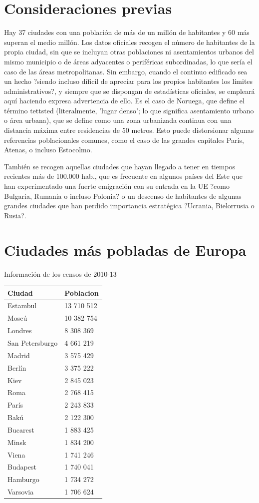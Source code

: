 \documentclass[10pt,letterpaper,oneside]{book}
\begin{document}
\section{Consideraciones previas}
Hay 37 ciudades con una población de más de un millón de habitantes y 60 más superan el medio millón. Los datos oficiales recogen el número de habitantes de la propia ciudad, sin que se incluyan otras poblaciones ni asentamientos urbanos del mismo municipio o de áreas adyacentes o periféricas subordinadas, lo que sería el caso de las áreas metropolitanas. Sin embargo, cuando el continuo edificado sea un hecho ?siendo incluso díficil de apreciar para los propios habitantes los límites administrativos?, y siempre que se dispongan de estadísticas oficiales, se empleará aquí haciendo expresa advertencia de ello. Es el caso de Noruega, que define el término tettsted (literalmente, 'lugar denso'; lo que significa asentamiento urbano o área urbana), que se define como una zona urbanizada continua con una distancia máxima entre residencias de 50 metros. Esto puede distorsionar algunas referencias poblacionales comunes, como el caso de las grandes capitales París, Atenas, o incluso Estocolmo.

También se recogen aquellas ciudades que hayan llegado a tener en tiempos recientes más de 100.000 hab., que es frecuente en algunos países del Este que han experimentado una fuerte emigración con su entrada en la UE ?como Bulgaria, Rumania o incluso Polonia? o un descenso de habitantes de algunas grandes ciudades que han perdido importancia estratégica ?Ucrania, Bielorrusia o Rusia?.

\section{Ciudades más pobladas de Europa}

Información de los censos de 2010-13\\

\begin{tabular}{ll}
	\hline Ciudad & Poblacion \\
	\hline Estambul & 13 710 512 \\ 
	 Moscú & 10 382 754 \\ 
	 Londres & 8 308 369 \\ 
	 San Petersburgo & 4 661 219 \\ 
	 Madrid & 3 575 429 \\ 
	 Berlín & 3 375 222 \\ 
	 Kiev & 2 845 023 \\
 	 Roma & 2 768 415 \\
	 París & 2 243 833 \\
	 Bakú & 2 122 300 \\
	 Bucarest & 1 883 425 \\
     Minsk & 1 834 200 \\
     Viena & 1 741 246 \\
     Budapest & 1 740 041 \\
     Hamburgo & 1 734 272 \\
     Varsovia & 1 706 624\\
	\hline 
\end{tabular} 
\end{document}
